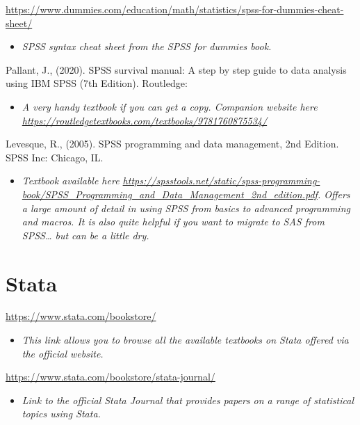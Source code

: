 \documentclass[
]{book}
\providecommand{\tightlist}{%
  \setlength{\itemsep}{0pt}\setlength{\parskip}{0pt}}
\begin{document}
\url{https://www.dummies.com/education/math/statistics/spss-for-dummies-cheat-sheet/}

\begin{itemize}
\tightlist
\item
  \emph{SPSS syntax cheat sheet from the SPSS for dummies book. }
\end{itemize}

Pallant, J., (2020). SPSS survival manual: A step by step guide to data analysis using IBM SPSS (7th Edition). Routledge:

\begin{itemize}
\tightlist
\item
  \emph{A very handy textbook if you can get a copy. Companion website here \url{https://routledgetextbooks.com/textbooks/9781760875534/}}
\end{itemize}

Levesque, R., (2005). SPSS programming and data management, 2nd Edition. SPSS Inc: Chicago, IL.

\begin{itemize}
\tightlist
\item
  \emph{Textbook available here \url{https://spsstools.net/static/spss-programming-book/SPSS_Programming_and_Data_Management_2nd_edition.pdf}. Offers a large amount of detail in using SPSS from basics to advanced programming and macros. It is also quite helpful if you want to migrate to SAS from SPSS\ldots{} but can be a little dry.}
\end{itemize}

\section{Stata}\label{stata}

\url{https://www.stata.com/bookstore/}

\begin{itemize}
\tightlist
\item
  \emph{This link allows you to browse all the available textbooks on Stata offered via the official website.}
\end{itemize}

\url{https://www.stata.com/bookstore/stata-journal/}

\begin{itemize}
\tightlist
\item
  \emph{Link to the official Stata Journal that provides papers on a range of statistical topics using Stata.}
\end{itemize}
\end{document}
